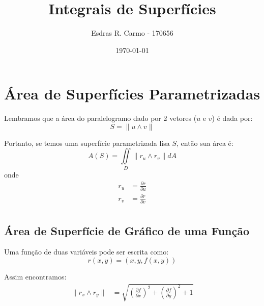 \documentclass{article}
\author{Esdras R. Carmo - 170656}
\title{Integrais de Superfícies}
\date{\today}
\newcommand{\doubleint}[2] {\iint\limits_{#1} #2}
\newcommand{\norm}[1] {\left.\parallel #1 \right.\parallel}
\newcommand{\PartialDer}[2] {\frac{\partial #1}{\partial #2}}
\begin{document}
    \maketitle

    \section{Área de Superfícies Parametrizadas}
        Lembramos que a área do paralelogramo dado por 2 vetores ($u$ e $v$) é dada por:
        \[
            S = \norm{u \wedge v}
        \]

        Portanto, se temos uma superfície parametrizada lisa $S$, então sua área é:
        \[
            A(S) = \doubleint{D}{\norm{r_u \wedge r_v}} dA
        \]
        onde
        \begin{align*}
            r_u &= \PartialDer{r}{u}\\
            r_v &= \PartialDer{r}{v}\\
        \end{align*}

        \subsection{Área de Superfície de Gráfico de uma Função}
            Uma função de duas variáveis pode ser escrita como:
            \[
                r(x,y) = (x, y, f(x,y))
            \]

            Assim encontramos:
            \begin{align*}
                \norm{r_x \wedge r_y} &= \sqrt{ \left(\PartialDer{f}{x}\right)^2 + \left(\PartialDer{f}{y}\right)^2 + 1 }
            \end{align*}
\end{document}
